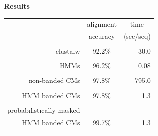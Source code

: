 \documentclass[landscape]{slides}
\begin{document}
\begin{slide}
\begin{center}
\large
\textbf{Results}
\end{center}
\medskip
\medskip
\begin{center}

\begin{tabular}{rcr} 
& \multicolumn{1}{c}{alignment} & \multicolumn{1}{c}{time} \\
& \multicolumn{1}{c}{accuracy} & \multicolumn{1}{c}{(sec/seq)} \\ \hline
& \multicolumn{1}{c}{} & \multicolumn{1}{c}{} \\
clustalw & 92.2\% & 30.0 \\ 
& \multicolumn{1}{c}{} & \multicolumn{1}{c}{} \\
HMMs & 96.2\% & 0.08 \\ 
& \multicolumn{1}{c}{} & \multicolumn{1}{c}{} \\
non-banded CMs & 97.8\% & 795.0 \\ 
& \multicolumn{1}{c}{} & \multicolumn{1}{c}{} \\
HMM banded CMs & 97.8\% & 1.3 \\ %
& \multicolumn{1}{c}{} & \multicolumn{1}{c}{} \\
probabilistically masked & & \\
HMM banded CMs           & 99.7\% & 1.3 \\ %
& \multicolumn{1}{c}{} & \multicolumn{1}{c}{} \\
\end{tabular}
\end{center}

\vfill
\end{slide}
%
\end{document}
